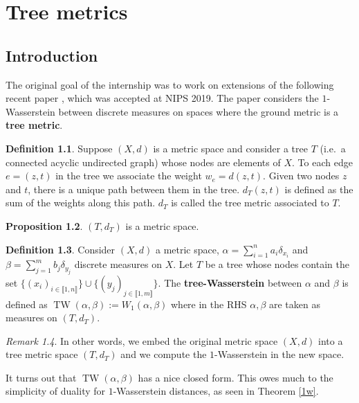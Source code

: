 \documentclass[12pt]{report}
\theoremstyle{definition}
\newtheorem{defi}{Definition}[section]
\newtheorem{prop}[defi]{Proposition}
\theoremstyle{remark}
\newtheorem{rem}[defi]{Remark}
\DeclareMathOperator{\tw}{TW}
\begin{document}
\chapter{Tree metrics}

\section{Introduction}

\hspace{\parindent} The original goal of the internship was to work on extensions of the following recent paper \cite{le2019tree}, which was accepted at NIPS 2019. The paper considers the $1$-Wasserstein between discrete measures on spaces where the ground metric is a \textbf{tree metric}.

\begin{defi}
	Suppose $(X,d)$ is a metric space and consider a tree $T$ (i.e.\ a connected acyclic undirected graph) whose nodes are elements of $X$. To each edge $e=(z,t)$ in the tree we associate the weight $w_e=d(z,t)$. Given two nodes $z$ and $t$, there is a unique path between them in the tree. $d_T(z,t)$ is defined as the sum of the weights along this path. $d_T$ is called the tree metric associated to $T$.
\end{defi}

\begin{prop}
	$(T,d_T)$ is a metric space.
\end{prop}

\begin{defi}
	Consider $(X,d)$ a metric space, $\alpha=\sum_{i=1}^n a_i \delta_{x_i}$ and $\beta=\sum_{j=1}^m b_j \delta_{y_j}$ discrete measures on $X$. Let $T$ be a tree whose nodes contain the set $\{(x_i)_{i\in \llbracket 1,n\rrbracket}\} \cup \{(y_j)_{j\in \llbracket 1,m\rrbracket}\}$. The \textbf{tree-Wasserstein} between $\alpha$ and $\beta$ is defined as $\tw(\alpha,\beta) := W_1(\alpha,\beta)$ where in the RHS $\alpha,\beta$ are taken as measures on $(T,d_T)$.
\end{defi}

\begin{rem}
	In other words, we embed the original metric space $(X,d)$ into a tree metric space $(T,d_T)$ and we compute the $1$-Wasserstein in the new space.
\end{rem}

It turns out that $\tw(\alpha,\beta)$ has a nice closed form. This owes much to the simplicity of duality for $1$-Wasserstein distances, as seen in Theorem \ref{1w}.
\end{document}
